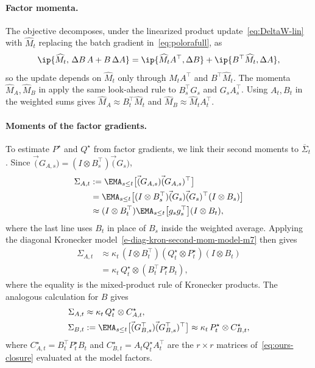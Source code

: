 \paragraph{Factor momenta.} The objective decomposes, under the linearized
product update~\eqref{eq:DeltaW-lin} with $\widehat M_t$ replacing the batch
gradient in~\eqref{eq:polorafull}, as
\[
  \ip{\widehat M_t,\,\Delta B\,A+B\,\Delta A}
  =\ip{\widehat M_tA^\top,\Delta B}+\ip{B^\top\widehat M_t,\Delta A},
\]
so the update depends on $\widehat M_t$ only through $\widehat M_tA^\top$
and $B^\top\widehat M_t$. The momenta $\widehat M_A,\widehat M_B$ in
 apply the same look-ahead rule to $B_s^\top G_s$ and
$G_sA_s^\top$. Using $A_t,B_t$ in the weighted sums gives
$\widehat M_A\approx B_t^\top\widehat M_t$ and
$\widehat M_B\approx\widehat M_tA_t^\top$.

\paragraph{Moments of the factor gradients.} To estimate $P^\star$ and
$Q^\star$ from factor gradients, we link their second moments to $\overline{\Sigma}_t$.
Since
$\vec(G_{A,s})=(I\otimes B_s^\top)\vec(G_s)$,
\begin{align*}
 \Sigma_{A,t} &:=  \EMA_{s \leq t}\big[ \vec(G_{A,s})  \vec(G_{A,s})^\top\big]  \\
 &=  \EMA_{s \leq t}\big[ (I\otimes B_s^\top)\vec(G_s)\vec(G_s)^\top   (I\otimes B_s)\big]  \\
   &\approx  (I\otimes B_t^\top) \EMA_{s \leq t}\big[ g_s g_s^\top   \big]  (I\otimes B_t),
\end{align*}
where the last line uses $B_t$ in place of $B_s$ inside the weighted
average. Applying the diagonal Kronecker model~\eqref{e-diag-kron-second-mom-model-m7}
then gives
\begin{align*}
 \Sigma_{A,t}
   &\approx
   \kappa_t\,
   (I\otimes B_t^\top)
   (Q^\star_t\otimes P^\star_t)
   (I\otimes B_t) \\
   &= \kappa_t\,Q^\star_t\otimes(B_t^\top P^\star_tB_t),
\end{align*}
where the equality is the mixed-product rule of Kronecker products. The
analogous calculation for $B$ gives
\begin{align}
  \Sigma_{A,t}
    &\approx \kappa_t\,Q^\star_t\otimes C^\star_{A,t},
  \nonumber \\
  \Sigma_{B,t}
    &:=
      \EMA_{s \leq t}\big[
        \vec(G_{B,s}^\top)\vec(G_{B,s}^\top)^\top
      \big]
    \approx \kappa_t\,P^\star_t\otimes C^\star_{B,t},
  \label{eq:observable-moments-m7}
\end{align}
where $C^\star_{A,t}=B_t^\top P^\star_tB_t$ and
$C^\star_{B,t}=A_tQ^\star_tA_t^\top$ are the $r\times r$ matrices
of~\eqref{eq:ours-closure} evaluated at the model factors.

